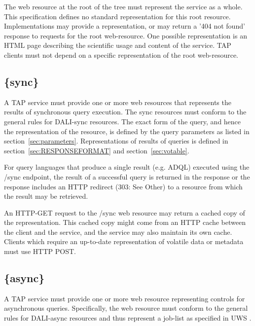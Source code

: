 \documentclass[11pt,letter]{ivoa}
\begin{document}
The web resource at the root of the tree must represent the service as a whole. 
This specification defines no standard representation for this root resource. 
Implementations may provide a representation, or may return a '404 not found' 
response to requests for the root web-resource. One possible representation is 
an HTML page describing the scientific usage and content of the service. TAP 
clients must not depend on a specific representation of the root web-resource.

\subsection{\{sync\}}
\label{sec:tap-sync}

A TAP service must provide one or more web resources that represents the results 
of synchronous query execution. The {sync} resources must conform to the general rules for
DALI-sync  resources. The exact form of the query, and hence the 
representation of the resource, is defined by the  query parameters as listed in 
section~\ref{sec:parameters}. Representations of results of queries is defined in 
section~\ref{sec:RESPONSEFORMAT} and section~\ref{sec:votable}.

For query languages that produce a single result (e.g. ADQL) executed using the 
/sync endpoint, the result of a successful query is returned in the response or 
the response includes an HTTP redirect (303: See Other) to a resource from 
which the result may be retrieved.

An HTTP-GET request to the /sync web resource may return a cached copy of the 
representation. This cached copy might come from an HTTP cache between the 
client and the service, and the service may also maintain its own cache. Clients 
which require an up-to-date representation of volatile data or metadata must use 
HTTP POST.

\subsection{\{async\}}
\label{sec:tap-async}

A TAP service must provide one or more web resource representing controls for 
asynchronous queries. Specifically, the web resource must conform to the general rules
for DALI-async resources and thus represent a job-list 
as specified in UWS \citep{std:UWS}.
\end{document}
